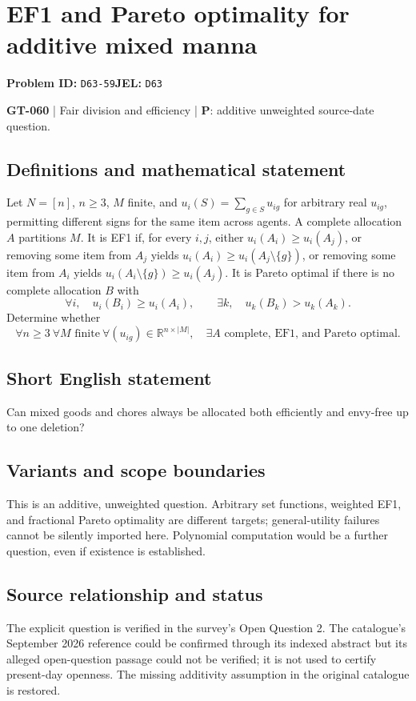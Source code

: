 \documentclass[11pt,a4paper]{article}
\begin{document}
\section*{EF1 and Pareto optimality for additive mixed manna}
\textbf{Problem ID:} \texttt{D63-59}\quad \textbf{JEL:} \texttt{D63}\par
\label{problem:OP-0190}
\label{game:GT-060}
{\sffamily\small\color{muted}
\textbf{GT-060} | Fair division and efficiency | \textbf{P}: additive unweighted source-date question.
\par}
\subsection*{Definitions and mathematical statement}
Let $N=[n]$, $n\geq3$, $M$ finite, and $u_i(S)=\sum_{g\in S}u_{ig}$ for arbitrary real $u_{ig}$, permitting different signs for the same item across agents. A complete allocation $A$ partitions $M$. It is EF1 if, for every $i,j$, either $u_i(A_i)\geq u_i(A_j)$, or removing some item from $A_j$ yields $u_i(A_i)\geq u_i(A_j\setminus\{g\})$, or removing some item from $A_i$ yields $u_i(A_i\setminus\{g\})\geq u_i(A_j)$. It is Pareto optimal if there is no complete allocation $B$ with
\[
 \forall i,\quad u_i(B_i)\geq u_i(A_i),
 \qquad \exists k,\quad u_k(B_k)>u_k(A_k).
\]
Determine whether
\[
 \forall n\geq3\ \forall M\text{ finite}\ \forall(u_{ig})\in\mathbb R^{n\times|M|},
 \quad\exists A\text{ complete, EF1, and Pareto optimal}.
\]
\subsection*{Short English statement}
Can mixed goods and chores always be allocated both efficiently and envy-free up to one deletion?
\subsection*{Variants and scope boundaries}
This is an additive, unweighted question. Arbitrary set functions, weighted EF1, and fractional Pareto optimality are different targets; general-utility failures cannot be silently imported here. Polynomial computation would be a further question, even if existence is established.
\subsection*{Source relationship and status}
The explicit question is verified in the survey's Open Question 2. The catalogue's September 2026 reference could be confirmed through its indexed abstract but its alleged open-question passage could not be verified; it is not used to certify present-day openness. The missing additivity assumption in the original catalogue is restored.
\end{document}
